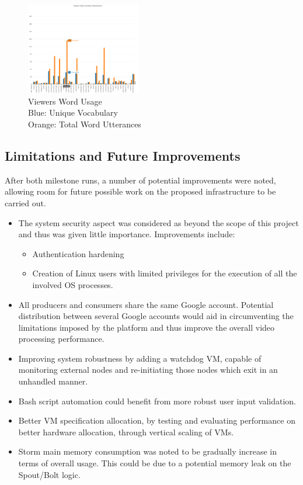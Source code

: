 \documentclass[10pt,conference]{IEEEtran}
\begin{document}
\clearpage

\begin{figure}[h]
    \centering
    \includegraphics[height=4cm,keepaspectratio]{ViewersWordUsage.png}
    \captionsetup                               {justification=centering}
    \caption                                    {Viewers Word Usage \\
                                                 Blue: Unique Vocabulary \\
                                                 Orange: Total Word Utterances}
    \label                                      {fig:ViewersWordUsage}
\end{figure}

\subsection{Limitations and Future Improvements}
After both milestone runs, a number of potential improvements were noted, allowing room for future possible work on the proposed infrastructure to be carried out.

\begin{itemize}
    \item The system security aspect was considered as beyond the scope of this project and thus was given little importance. Improvements include:
        \begin{itemize}
            \item Authentication hardening
            \item Creation of Linux users with limited privileges for the execution of all the involved OS processes.
        \end{itemize}
    \item All producers and consumers share the same Google account. Potential distribution between several Google accounts would aid in circumventing the limitations imposed by the platform \cite{GoogleSpeechQuotas} and thus improve the overall video processing performance.
    \item Improving system robustness by adding a watchdog VM, capable of monitoring external nodes and re-initiating those nodes which exit in an unhandled manner.
    \item Bash script automation could benefit from more robust user input validation.
    \item Better VM specification allocation, by testing and evaluating performance on better hardware allocation, through vertical scaling of VMs.
    \item Storm main memory consumption was noted to be gradually increase in terms of overall usage. This could be due to a potential memory leak on the Spout/Bolt logic.
\end{itemize}
\end{document}
